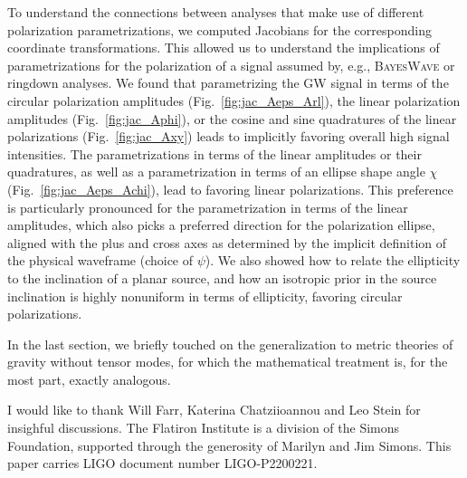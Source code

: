 \documentclass[aps,prd,twocolumn,superscriptaddress,preprintnumbers,floatfix,nofootinbib]{revtex4-2}
\newcommand{\dcc}{LIGO-P2200221}
\begin{document}
To understand the connections between analyses that make use of different polarization parametrizations, we computed Jacobians for the corresponding coordinate transformations.
This allowed us to understand the implications of parametrizations for the polarization of a signal assumed by, e.g., \textsc{BayesWave} or ringdown analyses.
We found that parametrizing the GW signal in terms of the circular polarization amplitudes (Fig.~\ref{fig:jac_Aeps_Arl}), the linear polarization amplitudes (Fig.~\ref{fig:jac_Aphi}), or the cosine and sine quadratures of the linear polarizations (Fig.~\ref{fig:jac_Axy}) leads to implicitly favoring overall high signal intensities.
The parametrizations in terms of the linear amplitudes or their quadratures, as well as a parametrization in terms of an ellipse shape angle $\chi$ (Fig.~\ref{fig:jac_Aeps_Achi}), lead to favoring linear polarizations.
This preference is particularly pronounced for the parametrization in terms of the linear amplitudes, which also picks a preferred direction for the polarization ellipse, aligned with the plus and cross axes as determined by the implicit definition of the physical waveframe (choice of $\psi$).
We also showed how to relate the ellipticity to the inclination of a planar source, and how an isotropic prior in the source inclination is highly nonuniform in terms of ellipticity, favoring circular polarizations.

In the last section, we briefly touched on the generalization to metric theories of gravity without tensor modes, for which the mathematical treatment is, for the most part, exactly analogous.

\begin{acknowledgments}
I would like to thank Will Farr, Katerina Chatziioannou and Leo Stein for insighful discussions.
The Flatiron Institute is a division of the Simons Foundation, supported through the generosity of Marilyn and Jim Simons.
This paper carries LIGO document number \dcc{}.
\end{acknowledgments}




\end{document}
